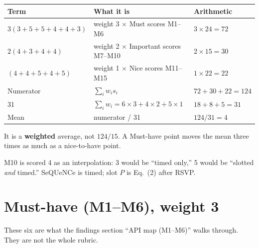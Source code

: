\documentclass[11pt]{article}
\begin{document}
\begin{center}
\begin{tabularx}{\textwidth}{@{}l Y l@{}}
\toprule
Term & What it is & Arithmetic \\
\midrule
$3(3+5+5+4+4+3)$ & weight 3 $\times$ Must scores M1--M6 & $3\times 24=72$ \\
$2(4+3+4+4)$ & weight 2 $\times$ Important scores M7--M10 & $2\times 15=30$ \\
$(4+4+5+4+5)$ & weight 1 $\times$ Nice scores M11--M15 & $1\times 22=22$ \\
Numerator & $\sum_i w_i s_i$ & $72+30+22=124$ \\
31 & $\sum_i w_i=6\times 3+4\times 2+5\times 1$ & $18+8+5=31$ \\
Mean & numerator / 31 & $124/31=4$ \\
\bottomrule
\end{tabularx}
\end{center}

It is a \textbf{weighted} average, not $124/15$.
A Must-have point moves the mean three times as much as a nice-to-have point.

M10 is scored 4 as an interpolation: 3 would be ``timed only,'' 5 would be ``slotted \emph{and} timed.''
SeQUeNCe is timed; slot $P$ is Eq.~(2) after RSVP.

\section{Must-have (M1--M6), weight 3}

These six are what the findings section ``API map (M1--M6)'' walks through.
They are not the whole rubric.
\end{document}
